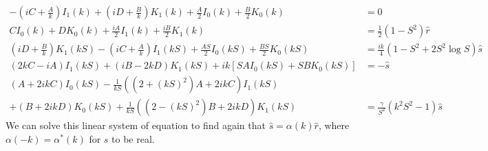 \documentclass[12pt]{article}
\begin{document}
\footnotesize
\begin{align}
-\left(iC+\frac{A}{k}\right)I_1(k)+\left(iD+\frac{B}{k}\right)K_1(k)+\frac{A}{2}I_0(k)+\frac{B}{2}K_0(k)&=0\\
CI_0(k)+DK_0(k)+\frac{iA}{2}I_1(k)+\frac{iB}{2}K_1(k)&=\frac{1}{2}(1-S^2)\hat r\\
\left(iD+\frac{B}{k}\right)K_1(kS)-\left(iC+\frac{A}{k}\right)I_1(kS)+\frac{AS}{2}I_0(kS)+\frac{BS}{2}K_0(kS)&=\frac{ik}{4}(1-S^2+2S^2\log S)\hat{s}\\
(2kC-iA)I_1(kS)+(iB-2kD)K_1(kS)+ik[SAI_0(kS)+SBK_0(kS)]&=-\hat s\\
(A+2ikC)I_0(kS)-\frac{1}{kS}((2+(kS)^2)A+2ikC)I_1(kS)&\nonumber\\+(B+2ikD)K_0(kS)+\frac{1}{kS}((2-(kS)^2)B+2ikD)K_1(kS)&=\frac{\gamma}{S^2}(k^2S^2-1)\hat s
\end{align}
\normalsize
We can solve this linear system of equation to find again that $\hat s =\alpha(k) \hat{r}$, where $\alpha(-k)=\alpha^*(k)$ for $s$ to be real. 
\end{document}
